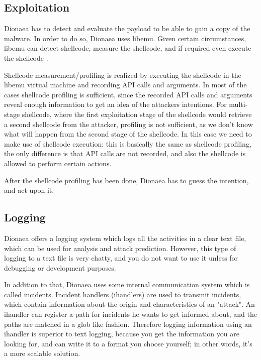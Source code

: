 \documentclass[epsfig,a4paper,11pt,titlepage,oneside,openany]{book}
\begin{document}
\subsection{Exploitation}

Dionaea has to detect and evaluate the payload to be able to gain a copy of the malware. In order to do so, Dionaea uses libemu. Given certain circumstances, libemu can detect shellcode, measure the shellcode, and if required even execute the shellcode \cite{dionaea}.

Shellcode measurement/profiling is realized by executing the shellcode in the libemu virtual machine and recording API calls and arguments. In most of the cases shellcode profiling is sufficient, since the recorded API calls and arguments reveal enough information to get an idea of the attackers intentions. For multi-stage shellcode, where the first exploitation stage of the shellcode would retrieve a second shellcode from the attacker, profiling is not sufficient, as we don’t know what will happen from the second stage of the shellcode. In this case we need to make use of shellcode execution: this is basically the same as shellcode profiling, the only difference is that API calls are not recorded, and also the shellcode is allowed to perform certain actions.

After the shellcode profiling has been done, Dionaea has to guess the intention, and act upon it.

\subsection{Logging}

Dionaea offers a logging system which logs all the activities in a clear text file, which can be used for analysis and attack prediction. However, this type of logging to a text file is very chatty, and you do not want to use it unless for debugging or development purposes.

In addition to that, Dionaea uses some internal communication system which is called incidents. Incident handlers (ihandlers) are used to transmit incidents, which contain information about the origin and characteristics of an "attack". An ihandler can register a path for incidents he wants to get informed about, and  the paths are matched in a glob like fashion. Therefore logging information using an ihandler is superior to text logging, because you get the information you are looking for, and can write it to a format you choose yourself; in other words, it’s a more scalable solution.
\end{document}
